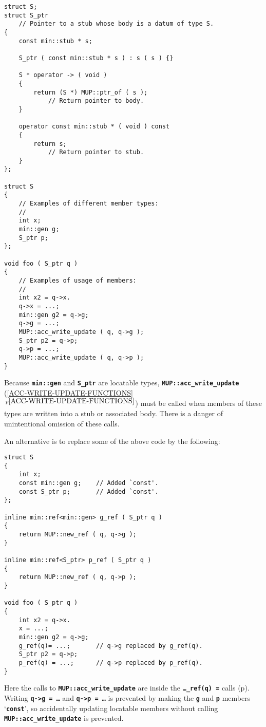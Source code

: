 \documentclass[12pt]{article}
\newcommand{\TT}[1]{{\tt \bfseries #1}}
\newcommand{\itemref}[1]{\ref{#1}$\,^{p\pageref{#1}}$}
\newcommand{\pagref}[1]{p\pageref{#1}}
\newcommand{\EOL}{\penalty \exhyphenpenalty}
\newenvironment{indpar}[1][0.3in]%
	{\begin{list}{}%
		     {\setlength{\itemsep}{0in}%
		      \setlength{\topsep}{0in}%
		      \setlength{\parsep}{1ex}%
		      \setlength{\labelwidth}{#1}%
		      \setlength{\leftmargin}{#1}%
		      \addtolength{\leftmargin}{\labelsep}}%
	 \item}%
	{\end{list}}
\begin{document}
\begin{indpar}\begin{verbatim}
struct S;
struct S_ptr
    // Pointer to a stub whose body is a datum of type S.
{
    const min::stub * s;

    S_ptr ( const min::stub * s ) : s ( s ) {}

    S * operator -> ( void )
    {
        return (S *) MUP::ptr_of ( s );
            // Return pointer to body.
    }

    operator const min::stub * ( void ) const
    {
        return s;
            // Return pointer to stub.
    }
};

struct S
{
    // Examples of different member types:
    //
    int x;
    min::gen g;
    S_ptr p;
};

void foo ( S_ptr q )
{
    // Examples of usage of members:
    //
    int x2 = q->x.
    q->x = ...;
    min::gen g2 = q->g;
    q->g = ...;
    MUP::acc_write_update ( q, q->g );
    S_ptr p2 = q->p;
    q->p = ...;
    MUP::acc_write_update ( q, q->p );
}
\end{verbatim}\end{indpar}

Because \TT{min::gen} and \TT{S\_ptr} are locatable types,
\TT{MUP::\EOL acc\_\EOL write\_\EOL update}
(\itemref{ACC-WRITE-UPDATE-FUNCTIONS}) must be called when
members of these types are written into a stub or associated body.  There is
a danger of unintentional omission of these calls.

An alternative is to replace some of the above code by the following:

\begin{indpar}\begin{verbatim}
struct S
{
    int x;
    const min::gen g;    // Added `const'.
    const S_ptr p;       // Added `const'.
};

inline min::ref<min::gen> g_ref ( S_ptr q )
{
    return MUP::new_ref ( q, q->g );
}

inline min::ref<S_ptr> p_ref ( S_ptr q )
{
    return MUP::new_ref ( q, q->p );
}

void foo ( S_ptr q )
{
    int x2 = q->x.
    x = ...;
    min::gen g2 = q->g;
    g_ref(q)= ...;       // q->g replaced by g_ref(q).
    S_ptr p2 = q->p;
    p_ref(q) = ...;      // q->p replaced by p_ref(q).
}
\end{verbatim}\end{indpar}

Here the calls to \TT{MUP::acc\_write\_update} are inside the
\TT{\ldots\_ref(q) =} calls (\pagref{LOCATABLE_REF}).
Writing \TT{q->g = \ldots}
and \TT{q->p = \ldots} is prevented by making the \TT{g} and \TT{p}
members `\TT{const}', so accidentally updating locatable members
without calling \TT{MUP::\EOL acc\_\EOL write\_\EOL update}
is prevented.
\end{document}
